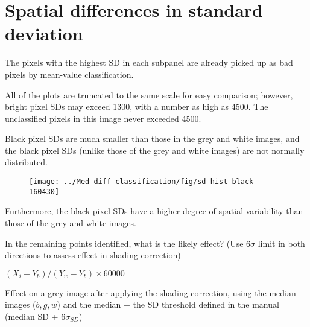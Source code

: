 \documentclass[10pt,fleqn]{article}
\begin{document}
\clearpage


\section{Spatial differences in standard deviation}



The pixels with the highest SD in each subpanel are already picked up as bad pixels by mean-value classification.

All of the plots are truncated to the same scale for easy comparison; however, bright pixel SDs may exceed 1300, with a number as high as 4500. The unclassified pixels in this image never exceeded 4500.

Black pixel SDs are much smaller than those in the grey and white images, and the black pixel SDs (unlike those of the grey and white images) are not normally distributed.

\begin{figure}[!ht]
\caption{}
\centering
\texttt{[image: ../Med-diff-classification/fig/sd-hist-black-160430]}

\end{figure}

Furthermore, the black pixel SDs have a higher degree of spatial variability than those of the grey and white images.



In the remaining points identified, what is the likely effect? (Use $6\sigma$ limit in both directions to assess effect in shading correction)

$(X_i - Y_b) / (Y_w - Y_b) \times 60000$

\begin{table}[!ht]
\caption{Effect on a grey image after applying the shading correction, using the median images ($b, g, w$) and the median $\pm$ the SD threshold defined in the manual (median SD + $6\sigma_{SD}$)}
\centering
{}%
			{\csvlinetotablerow}%
\end{table}
\end{document}
